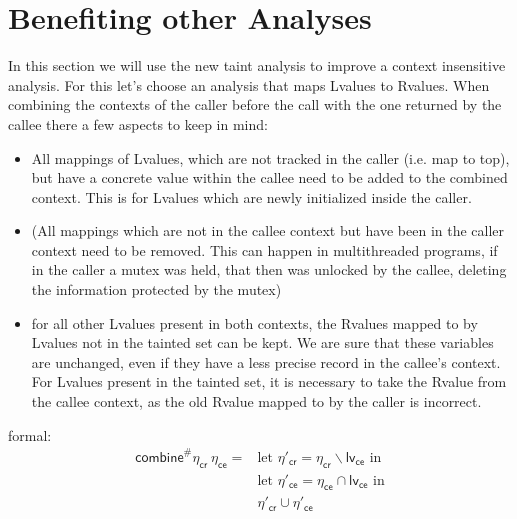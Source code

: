   \section{Benefiting other Analyses}
  In this section we will use the new taint analysis to improve a context insensitive analysis. For this let's choose an analysis that maps Lvalues to Rvalues.
  When combining the contexts of the caller before the call with the one returned by the callee there a few aspects to keep in mind:
  \begin{itemize}
    \item All mappings of Lvalues, which are not tracked in the caller (i.e. map to top), but have a concrete value within the callee need to be added to the combined context. This is for Lvalues which are newly initialized inside the caller.
    \item (All mappings which are not in the callee context but have been in the caller context need to be removed. This can happen in multithreaded programs, if in the caller a mutex was held, that then was unlocked by the callee, deleting the information protected by the mutex)
    \item for all other Lvalues present in both contexts, the Rvalues mapped to by Lvalues not in the tainted set can be kept. We are sure that these variables are unchanged, even if they have a less precise record in the callee's context. For Lvalues present in the tainted set, it is necessary to take the Rvalue from the callee context, as the old Rvalue mapped to by the caller is incorrect.
  \end{itemize}

  formal:\\

  \begin{align}
    \textsf{combine}^{\#} \eta_\textsf{cr}\ \eta_\textsf{ce} = & \text{let } \eta'_\textsf{cr} = \eta_\textsf{cr} \backslash \textsf{lv}_\textsf{ce} \text{ in} \\
    & \text{let } \eta'_\textsf{ce} = \eta_\textsf{ce} \cap \textsf{lv}_\textsf{ce} \text{ in} \\
    & \eta'_\textsf{cr} \cup \eta'_\textsf{ce}
  \end{align}


